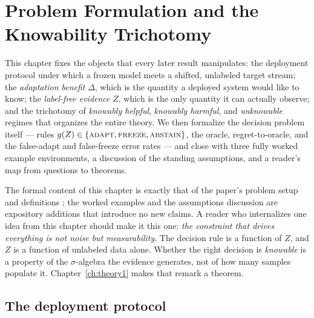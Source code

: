 
\chapter{Problem Formulation and the Knowability Trichotomy}\label{ch:formulation}

This chapter fixes the objects that every later result manipulates: the
deployment protocol under which a frozen model meets a shifted, unlabeled
target stream; the \emph{adaptation benefit} $\Delta$, which is the quantity a
deployed system would like to know; the \emph{label-free evidence} $Z$, which
is the only quantity it can actually observe; and the trichotomy of
\emph{knowably helpful}, \emph{knowably harmful}, and \emph{unknowable}
regimes that organizes the entire theory. We then formalize the decision
problem itself --- rules $g(Z) \in \{\textsc{adapt}, \textsc{freeze},
\textsc{abstain}\}$, the oracle, regret-to-oracle, and the false-adapt and
false-freeze error rates --- and close with three fully worked example
environments, a discussion of the standing assumptions, and a reader's map
from questions to theorems.

The formal content of this chapter is exactly that of the paper's problem
setup and definitions \cite{kbound2026repo}; the worked examples and the
assumptions discussion are expository additions that introduce no new claims.
A reader who internalizes one idea from this chapter should make it this one:
\emph{the constraint that drives everything is not noise but measurability}.
The decision rule is a function of $Z$, and $Z$ is a function of unlabeled
data alone. Whether the right decision is \emph{knowable} is a property of
the $\sigma$-algebra the evidence generates, not of how many samples populate
it. Chapter~\ref{ch:theory1} makes that remark a theorem.

\section{The deployment protocol}\label{sec:form-protocol}

